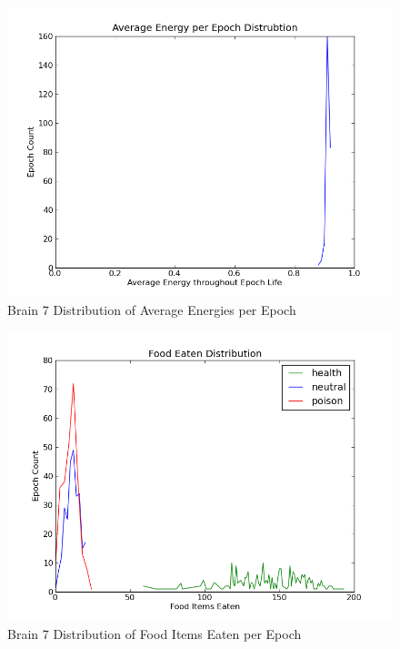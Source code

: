 \documentclass[a4paper,11pt]{article}
\begin{document}
\begin{figure}
\begin{center}
  \includegraphics[scale=1.0]{img/brain7/avgenergyGauss-0.01.png}
  \caption{Brain 7 Distribution of Average Energies per Epoch}
  \label{fig:b7avgenergy}
\end{center}
\end{figure}

\begin{figure}
\begin{center}
  \includegraphics[scale=1.0]{img/brain7/foodGauss-h30.46-n6.32-p7.75.png}
  \caption{Brain 7 Distribution of Food Items Eaten per Epoch}
  \label{fig:b7food}
\end{center}
\end{figure}
\end{document}
